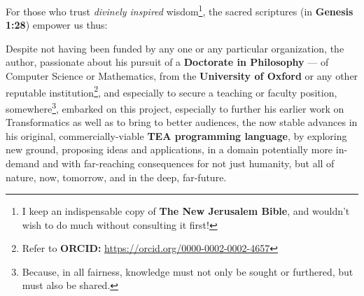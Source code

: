 \documentclass[a4paper, 18pt]{book} %
\begin{document}
\vspace{2em}

For those who trust \textit{divinely inspired} wisdom\footnote{I keep an indispensable copy of \textbf{The New Jerusalem Bible}, and wouldn't wish to do much without consulting it first!}, the sacred scriptures (in \textbf{Genesis 1:28}) empower us thus:


\vspace{2em}

\noindent
\begin{minipage}{1\textwidth}
\vspace{1em}
\begin{quotation}
\end{quotation}
\vspace{1em}
\end{minipage}

\vspace{2em}


Despite not having been funded by any one or any particular organization, the author, passionate about his pursuit of a \textbf{Doctorate in Philosophy} --- of Computer Science or Mathematics, from the \textbf{University of Oxford}\cite{lutalo_2025_sop}\cite{Lutalo2025_phd}\cite{lutalo_2026_sop} or any other reputable institution\footnote{Refer to \textbf{ORCID:} \url{https://orcid.org/0000-0002-0002-4657}}, and especially to secure a teaching or faculty position, somewhere\footnote{Because, in all fairness, knowledge must not only be sought or furthered, but must also be shared.}, embarked on this project, especially to further his earlier work on Transformatics\cite{transformatics} as well as to bring to better audiences, the now stable advances in his original, commercially-viable \textbf{TEA programming language}\cite{cli_tttt}\cite{lutalo_2026_sop}, by exploring new ground, proposing ideas and applications, in a domain potentially more in-demand and with far-reaching consequences for not just humanity, but all of nature, now, tomorrow, and in the deep, far-future. 

\vspace{2em}
\end{document}
